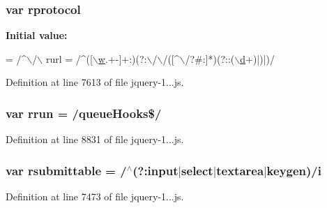 \subsubsection[{rprotocol}]{\setlength{\rightskip}{0pt plus 5cm}var rprotocol}\label{_scripts_2jquery-1_810_82_8js_a0f02b710647fcf95e74593954fb9b4cb}
{\bfseries Initial value\+:}
\begin{DoxyCode}
= /^\(\backslash\)/\(\backslash\)
    rurl = /^([\hyperlink{obj_2_release_2_package_2_package_tmp_2_scripts_2respond_8min_8js_a9721a992655f700bdc2e91ba68b71e26}{\(\backslash\)w}.+-]+:)(?:\(\backslash\)/\(\backslash\)/([^\(\backslash\)/?#:]*)(?::(\hyperlink{obj_2_release_2_package_2_package_tmp_2_scripts_2bootstrap_8min_8js_aeb337d295abaddb5ec3cb34cc2e2bbc9}{\(\backslash\)d}+)|)|)/
\end{DoxyCode}


Definition at line 7613 of file jquery-\/1...\+js.

\hypertarget{_scripts_2jquery-1_810_82_8js_acf9d5e6b315eca81eb432bb6ee280a2e}{}
\subsubsection[{rrun}]{\setlength{\rightskip}{0pt plus 5cm}var rrun = /queue\+Hooks\$/}\label{_scripts_2jquery-1_810_82_8js_acf9d5e6b315eca81eb432bb6ee280a2e}


Definition at line 8831 of file jquery-\/1...\+js.

\hypertarget{_scripts_2jquery-1_810_82_8js_a12d248d7e6c5985c5ea21f56fbef9e90}{}
\subsubsection[{rsubmittable}]{\setlength{\rightskip}{0pt plus 5cm}var rsubmittable = /$^\wedge$(?\+:input$\vert$select$\vert$textarea$\vert$keygen)/{\bf i}}\label{_scripts_2jquery-1_810_82_8js_a12d248d7e6c5985c5ea21f56fbef9e90}


Definition at line 7473 of file jquery-\/1...\+js.

\hypertarget{_scripts_2jquery-1_810_82_8js_a0e9cd4ca08945afe827846f34a36c74a}{}
